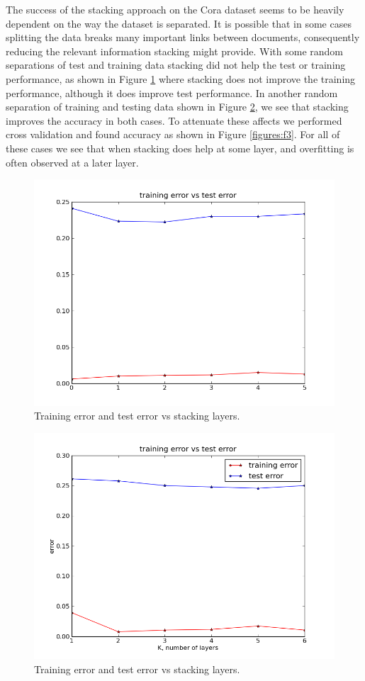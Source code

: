 \documentclass[a4paper,11pt]{article}
\begin{document}
The success of the stacking approach on the Cora dataset seems to be heavily
dependent on the way the dataset is separated. It is possible that in some 
cases splitting the data breaks many important links between documents,
consequently reducing the relevant information stacking might provide. 
With some random separations of test and training data stacking did not help
the test or training performance, as shown in Figure \ref{figures:f1} where
stacking does not improve the training performance, although it does improve
test performance. In another random separation of training and testing data 
shown in Figure \ref{figures:f2}, we see that stacking improves the accuracy 
in both cases. To attenuate these affects we performed cross validation and 
found accuracy as shown in Figure \ref{figures:f3}. For all of these cases we 
see that when stacking does help at some layer, and overfitting is often observed at a later layer.

\begin{figure}[!ht]
  \centering
  \includegraphics[width=4.5in]{WU5/trainingvstestD3R.png}
  \caption{Training error and test error vs stacking layers.}
  \label{figures:f1}
\end{figure}

\newpage

\begin{figure}[!ht]
  \centering
  \includegraphics[width=4.5in]{WU5/trainingvstestD2R.png}
  \caption{Training error and test error vs stacking layers.}
  \label{figures:f2}
\end{figure}
\end{document}
